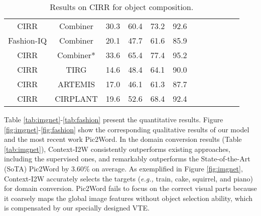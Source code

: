 \documentclass[letterpaper]{article} \usepackage{aaai24}  \usepackage{times}  \usepackage{helvet}  \usepackage{courier}  \usepackage[hyphens]{url}  \usepackage{graphicx} \urlstyle{rm} \def\UrlFont{\rm}  \usepackage{natbib}  \usepackage{caption} \frenchspacing  \setlength{\pdfpagewidth}{8.5in} \setlength{\pdfpageheight}{11in} \usepackage{algorithm}
\begin{document}
\begin{table}[t]
{\begin{tabular}{cccccccccccc}
\cmidrule(lr){1-6}
\multicolumn{1}{c|}{CIRR}                        & \multicolumn{1}{c|}{Combiner}                             & 30.3                                             & 60.4                                             & 73.2                                             & 92.6                                             \\
\multicolumn{1}{c|}{Fashion-IQ}                  & \multicolumn{1}{c|}{Combiner}                             & 20.1                                             & 47.7                                             & 61.6                                             & 85.9                                             \\ \multicolumn{1}{c|}{CIRR}                        & \multicolumn{1}{c|}{Combiner*}                            & 33.6                                             & 65.4                                             & 77.4                                             & 95.2                                             \\
\multicolumn{1}{c|}{CIRR}                        & \multicolumn{1}{c|}{TIRG}                                 & 14.6                                             & 48.4                                             & 64.1                                             & 90.0                                             \\
\multicolumn{1}{c|}{CIRR}                        & \multicolumn{1}{c|}{ARTEMIS}                              & 17.0                                             & 46.1                                             & 61.3                                             & 87.7                                             \\
\multicolumn{1}{c|}{CIRR}                        & \multicolumn{1}{c|}{CIRPLANT}                             & 19.6                                             & 52.6                                             & 68.4                                             & 92.4                                             \\ \bottomrule
\end{tabular}}
\caption{Results on CIRR for object composition.}
\label{tab:CIRR}
\end{table}

Table \ref{tab:imgnet}-\ref{tab:fashion} present the quantitative results. Figure \ref{fig:imgnet}-\ref{fig:fashion} show the corresponding qualitative results of our model and the most recent work Pic2Word. In the domain conversion results (Table \ref{tab:imgnet}), Context-I2W consistently outperforms existing approaches, including the supervised ones, and remarkably outperforms the State-of-the-Art (SoTA) Pic2Word by 3.60\% on average. As exemplified in Figure \ref{fig:imgnet}, Context-I2W accurately selects the targets (\textit{e.g.,}  train, cake, squirrel, and piano) for domain conversion. Pic2Word fails to focus on the correct visual parts because it coarsely maps the global image features without object selection ability, which is compensated by our specially designed VTE. 
\end{document}
